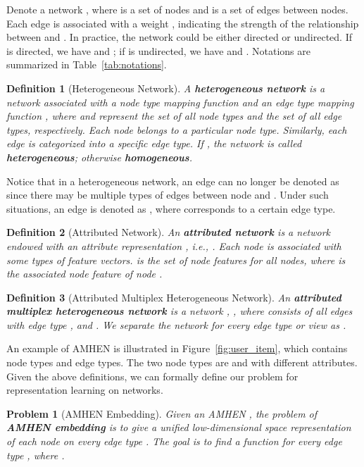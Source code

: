 \documentclass[sigconf]{acmart}
\newtheorem{definition}{Definition}
\newtheorem{problem}{Problem}
\begin{document}
Denote a network , where  is a set of  nodes and  is a set of edges between nodes. Each edge  is associated with a weight , indicating the strength of the relationship between  and . In practice, the network could be either directed or undirected. If  is directed, we have  and ; if  is undirected, we have  and .  Notations are summarized in Table~\ref{tab:notations}.

\begin{definition}[Heterogeneous Network]
A \textbf{heterogeneous network} \cite{sun2013pathselclus,chang2015heterogeneous} is a network  associated with a node type mapping function  and an edge type mapping function , where  and  represent the set of all node types and the set of all edge types, respectively. Each node  belongs to a particular node type. Similarly, each edge  is categorized into a specific edge type. 
If , the network is called \textbf{heterogeneous}; otherwise
\textbf{homogeneous}. 
\end{definition}

Notice that in a heterogeneous network, an edge  can no longer be denoted as  since there may be multiple types of edges between node  and . Under such situations, an edge is denoted as , where  corresponds to a certain edge type.

\begin{definition}[Attributed Network]
\label{def:ahn}
An \textbf{attributed network} \cite{huang2017label,chang2015heterogeneous}  is a network  endowed with an attribute representation , i.e., . Each node  is associated with some types of feature vectors.  is the set of node features for all nodes, where  is the associated node feature of node . 
\end{definition}

\begin{definition}[Attributed Multiplex Heterogeneous Network]
An \textbf{attributed multiplex heterogeneous network} is a network , , where  consists of all edges with edge type , and . We separate the network for every edge type or view  as . 
\end{definition}

An example of AMHEN is illustrated in Figure~\ref{fig:user_item}, which contains  node types and  edge types. The two node types are  and  with different attributes. 
Given the above definitions, we can formally define our problem for representation learning on networks.


\begin{problem}[AMHEN Embedding]
Given an AMHEN , the problem of \textbf{AMHEN embedding} is to give a unified low-dimensional space representation of each node  on every edge type . The goal is to find a function  for every edge type , where .
\end{problem}
\end{document}
